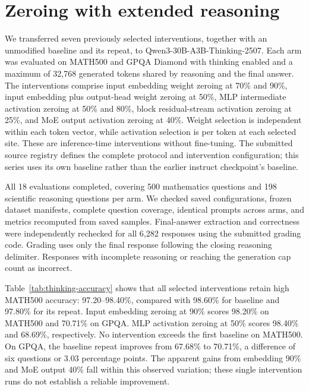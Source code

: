 \section{Zeroing with extended reasoning}
\label{sec:thinking-zeroing}
We transferred seven previously selected interventions, together with an
unmodified baseline and its repeat, to Qwen3-30B-A3B-Thinking-2507. Each arm
was evaluated on MATH500 and GPQA Diamond with thinking enabled and a maximum
of 32,768 generated tokens shared by reasoning and the final answer. The
interventions comprise input embedding weight zeroing at 70\% and 90\%,
input embedding plus output-head weight zeroing at 50\%, MLP intermediate
activation zeroing at 50\% and 80\%, block residual-stream activation zeroing
at 25\%, and MoE output activation zeroing at 40\%. Weight selection is
independent within each token vector, while activation selection is per token
at each selected site. These are inference-time interventions without fine-tuning.
The submitted source registry defines the complete protocol and intervention
configuration; this series uses its own baseline rather than the earlier
instruct checkpoint's baseline.

All 18 evaluations completed, covering 500 mathematics questions and 198
scientific reasoning questions per arm. We checked saved configurations,
frozen dataset manifests, complete question coverage, identical prompts across
arms, and metrics recomputed from saved samples. Final-answer extraction and
correctness were independently rechecked for all 6,282 responses using the
submitted grading code. Grading uses only the final response following the
closing reasoning delimiter. Responses with incomplete reasoning or reaching
the generation cap count as incorrect.

\begin{table}[ht]
\centering
\caption{Accuracy (\%) with the thinking checkpoint and extended generation
budget. MLP, block and MoE output rows zero activations; embedding rows zero
weights.}
\label{tab:thinking-accuracy}

\end{table}

Table~\ref{tab:thinking-accuracy} shows that all selected interventions retain
high MATH500 accuracy: 97.20--98.40\%, compared with 98.60\% for baseline
and 97.80\% for its repeat. Input embedding zeroing at 90\% scores 98.20\%
on MATH500 and 70.71\% on GPQA. MLP activation zeroing at 50\% scores
98.40\% and 68.69\%, respectively. No intervention exceeds the first baseline
on MATH500. On GPQA, the baseline repeat improves from 67.68\% to 70.71\%,
a difference of six questions or 3.03 percentage points. The apparent gains
from embedding 90\% and MoE output 40\% fall within this observed variation;
these single intervention runs do not establish a reliable improvement.

